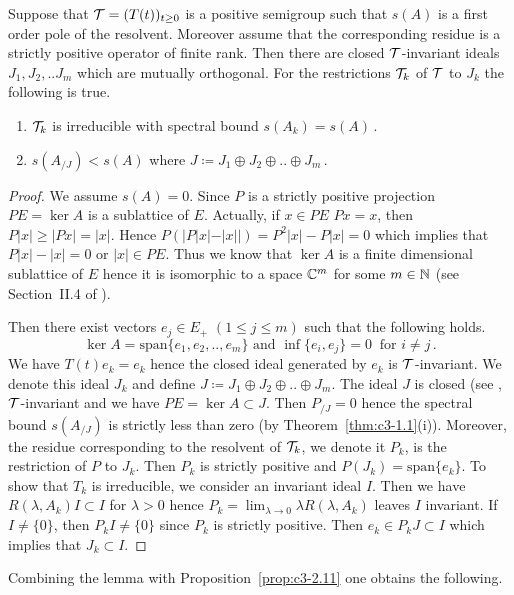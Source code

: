 \begin{lemma}\label{lem:c3-3.13}
	Suppose that $\mathcal{T} = (T(t))_{t \ge 0}$ is a positive semigroup such that $s(A)$ is a first order pole of the resolvent. 
	Moreover assume that the corresponding residue is a strictly positive operator of finite rank.
	Then there are closed $\mathcal{T}$-invariant ideals $J_{1},J_{2}, .. J_{m}$ which are mutually orthogonal. 
	For the restrictions  $\mathcal{T}_{k}$ of $\mathcal{T}$ to $J_{k}$ the following is true.
	\begin{enumerate}[\upshape (i)]
		\item $\mathcal{T}_{k}$ is irreducible with spectral bound $s(A_k) = s(A)$\,.
		\item $s(A_{/J}) < s(A)$  where $J \coloneqq  J_{1}\oplus J_{2}\oplus .. \oplus J_{m}\,.$
	\end{enumerate}
\end{lemma}
\begin{proof}
	We assume $s(A) = 0$. 
	Since $P$ is a strictly positive projection $PE = \ker A$ is a sublattice of $E$. 
	Actually, if $x \in PE$ \ie  $Px = x$, then $P|x| \geq |Px| = |x|$. 
	Hence $P(|P|x|-|x||) = P^{2}|x| - P|x| = 0$ which implies that $P|x| - |x| = 0$ or $|x| \in PE$.
	Thus we know that $\ker A$ is a finite dimensional sublattice of $E$ hence it is isomorphic to a space $\mathbb{C} ^{m}$ for some $m \in \mathbb{N}$ (see Section~II.4 of \citet{schaefer:1974}). 
	
	Then there exist vectors $e_{j} \in E_{+}$ $(1\leq j\leq m)$ such that the following holds.
	\begin{equation}\label{eq:c3-3.18}
		\ker A = \mathrm{span} \{e_{1},e_{2}, .. ,e_{m}\} \text{ and } \inf\{e_{i},e_{j}\} = 0 \ \text{ for }  i \neq j\,.
	\end{equation}
	We have $T(t)e_{k} = e_{k}$ hence the closed ideal generated by $e_{k}$ is $\mathcal{T}$-invariant. 
	We denote this ideal $J_{k}$ and define $J\coloneqq  J_{1}\oplus J_{2}\oplus .. \oplus J_{m}$.
	The ideal $J$ is closed 
    (see \citet[III Theorem~1.2]{schaefer:1974}, $\mathcal{T}$-invariant and we have $PE = \ker A \subset J$. 
	Then $P_{/J} = 0$ hence the spectral bound $s(A_{/J})$
	is strictly less than zero (by Theorem~\ref{thm:c3-1.1}(i)). 
	Moreover, the residue corresponding to the resolvent of $\mathcal{T}_{k}$, we denote it $P_{k}$, is the restriction of $P$ to $J_{k}$.
	Then $P_{k}$ is strictly positive and $P(J_{k}) = \mathrm{span}\{e_{k}\}$. 
	To show that $T_{k}$ is irreducible, we consider an invariant ideal $I$. 
	Then we have $R(\lambda,A_{k})I \subset I$ for $\lambda > 0$ hence $P_{k} = \lim_{\lambda \to 0}\lambda R(\lambda,A_{k})$ leaves $I$ invariant. 
	If $I \neq \{0\}$, then $P_{k}I \neq \{0\}$ since $P_{k}$ is strictly positive. 
	Then $e_{k} \in P_{k}J \subset I$ which implies that $J_{k} \subset I$.
\end{proof}
Combining the lemma with Proposition~\ref{prop:c3-2.11} one obtains the following.

